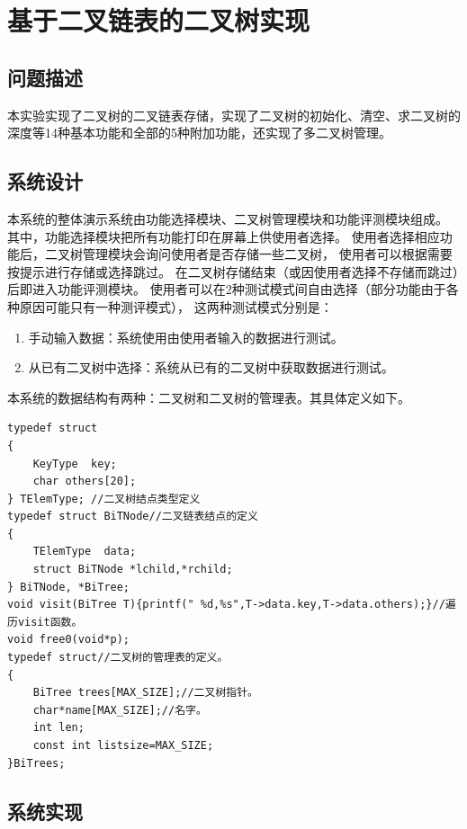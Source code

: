 \documentclass[supercite]{Experimental_Report}
\theoremstyle{definition}
\begin{document}
\section{基于二叉链表的二叉树实现}


\subsection{问题描述}

本实验实现了二叉树的二叉链表存储，实现了二叉树的初始化、清空、求二叉树的深度等14种基本功能和全部的5种附加功能，还实现了多二叉树管理。

\subsection{系统设计}

本系统的整体演示系统由功能选择模块、二叉树管理模块和功能评测模块组成。
其中，功能选择模块把所有功能打印在屏幕上供使用者选择。
使用者选择相应功能后，二叉树管理模块会询问使用者是否存储一些二叉树，
使用者可以根据需要按提示进行存储或选择跳过。
在二叉树存储结束（或因使用者选择不存储而跳过）后即进入功能评测模块。
使用者可以在2种测试模式间自由选择（部分功能由于各种原因可能只有一种测评模式），
这两种测试模式分别是：
\begin{enumerate}
	\renewcommand{\labelenumi}{\theenumi)}
		\item 手动输入数据：系统使用由使用者输入的数据进行测试。
		\item 从已有二叉树中选择：系统从已有的二叉树中获取数据进行测试。
	\end{enumerate}
本系统的数据结构有两种：二叉树和二叉树的管理表。其具体定义如下。
\begin{lstlisting}[title = 定义,frame=none]
typedef struct
{
	KeyType  key;
	char others[20];
} TElemType; //二叉树结点类型定义
typedef struct BiTNode//二叉链表结点的定义
{
	TElemType  data;
	struct BiTNode *lchild,*rchild;
} BiTNode, *BiTree;
void visit(BiTree T){printf(" %d,%s",T->data.key,T->data.others);}//遍历visit函数。 
void free0(void*p);
typedef struct//二叉树的管理表的定义。 
{
	BiTree trees[MAX_SIZE];//二叉树指针。 
	char*name[MAX_SIZE];//名字。 
	int len;
	const int listsize=MAX_SIZE;
}BiTrees;		
\end{lstlisting}

\subsection{系统实现}
\end{document}
